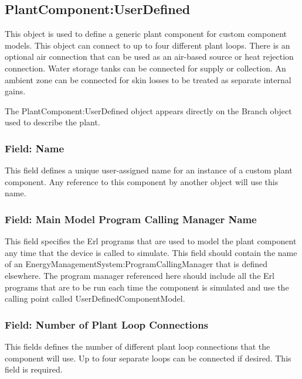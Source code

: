 \subsection{PlantComponent:UserDefined}\label{plantcomponentuserdefined}

This object is used to define a generic plant component for custom component models. This object can connect to up to four different plant loops. There is an optional air connection that can be used as an air-based source or heat rejection connection. Water storage tanks can be connected for supply or collection. An ambient zone can be connected for skin losses to be treated as separate internal gains.

The PlantComponent:UserDefined object appears directly on the Branch object used to describe the plant.

\subsubsection{Field: Name}\label{field-name-3-035}

This field defines a unique user-assigned name for an instance of a custom plant component. Any reference to this component by another object will use this name.

\subsubsection{Field: Main Model Program Calling Manager Name}\label{field-main-model-program-calling-manager-name}

This field specifies the Erl programs that are used to model the plant component any time that the device is called to simulate. This field should contain the name of an EnergyManagementSystem:ProgramCallingManager that is defined elsewhere. The program manager referenced here should include all the Erl programs that are to be run each time the component is simulated and use the calling point called UserDefinedComponentModel.

\subsubsection{Field: Number of Plant Loop Connections}\label{field-number-of-plant-loop-connections-2}

This fields defines the number of different plant loop connections that the component will use. Up to four separate loops can be connected if desired. This field is required.

